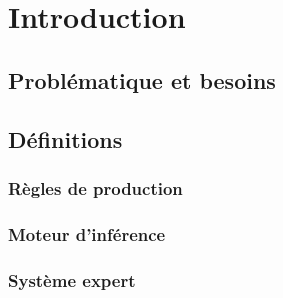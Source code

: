 \chapter{Introduction}
\section{Problématique et besoins}
\section{Définitions}
\subsection{Règles de production}
\subsection{Moteur d'inférence}
\subsection{Système expert}
